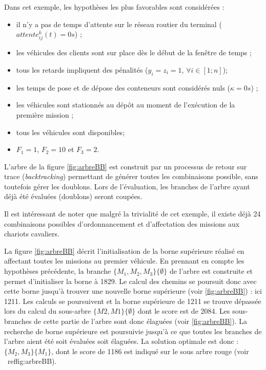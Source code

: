 Dans cet exemple, les hypothèses les plus favorables sont considérées :
\begin{itemize}
 \item il n'y a pas de temps d'attente sur le réseau routier du terminal ($attente^k_{ij}(t)=0s$) ;
 \item les véhicules des clients sont sur place dès le début de la fenêtre de temps ;
 \item tous les retards impliquent des pénalités ($y_i=z_i=1$, $\forall i \in [1;n]$);
 \item les temps de pose et de dépose des conteneurs sont considérés nuls ($\kappa = 0s$) ;
 \item les véhicules sont stationnés au dépôt au moment de l'exécution de la première mission ;
 \item tous les véhicules sont disponibles;
 \item $F_1 = 1$, $F_2 = 10$ et $F_3 = 2$.
\end{itemize}

L'arbre de la figure \ref{fig:arbreBB} est construit par un processus de retour sur trace (\textit{backtracking}) permettant de générer toutes les combinaisons possible, sans toutefois gérer les doublons. Lors de l'évaluation, les branches de l'arbre ayant déjà été évaluées (doublons) seront coupées. 

Il est intéressant de noter que malgré la trivialité de cet exemple, il existe déjà 24 combinaisons possibles d'ordonnancement et d'affectation des missions aux chariots cavaliers.

La figure \ref{fig:arbreBB} décrit l'initialisation de la borne supérieure réalisé en affectant toutes les missions au premier véhicule. En prennant en compte les hypothèses précédente, la branche $\{M_1,M_2,M_3\}\{\emptyset\}$ de l'arbre est construite et permet d'initialiser la borne à 1829. Le calcul des chemins se poursuit donc avec cette borne jusqu'à trouver une nouvelle borne supérieure (voir \ref{fig:arbreBB}) : ici 1211. Les calculs se poursuivent et la borne supérieure de 1211 se trouve dépassée lors du calcul du sous-arbre $\{M2,M1\} \{\emptyset\}$ dont le score est de 2084. Les sous-branches de cette partie de l'arbre sont donc élaguées (voir \ref{fig:arbreBB}). La recherche de borne supérieure est poursuivie jusqu'à ce que toutes les branches de l'arbre aient été soit évaluées soit élaguées. La solution optimale est donc : $\{M_2,M_3\}\{M_1\}$, dont le score de 1186 est indiqué sur le sous arbre rouge (voir \
ref{fig:arbreBB}).

